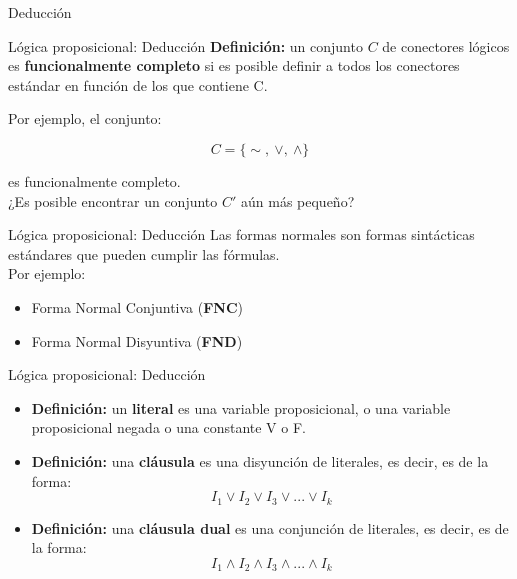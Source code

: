 \documentclass{beamer}
\begin{document}
\begin{frame}[plain,c]
  \vspace{1cm}
  \begin{center}
    \Huge Deducción
  \end{center}
\end{frame}


\begin{frame}{Lógica proposicional: Deducción}
  \textbf{Definición:} un conjunto $C$ de conectores lógicos es
  \textbf{funcionalmente completo} si es posible definir a todos los conectores
  estándar en función de los que contiene C.

  Por ejemplo, el conjunto:

  $$ C = \{\sim,\ \vee,\ \land\}$$

  es funcionalmente completo.\\

  ¿Es posible encontrar un conjunto $C'$ aún más pequeño?
\end{frame}


\begin{frame}{Lógica proposicional: Deducción}
  Las formas normales son formas sintácticas estándares que pueden cumplir las
  fórmulas.\\

  Por ejemplo:
  \begin{itemize}
    \item Forma Normal Conjuntiva (\textbf{FNC})
    \item Forma Normal Disyuntiva (\textbf{FND})
  \end{itemize}
\end{frame}


\begin{frame}{Lógica proposicional: Deducción}
  \begin{itemize}[<+->]
    \item \textbf{Definición:} un \textbf{literal} es una variable
          proposicional, o una variable proposicional negada o una constante V o
          F.
    \item \textbf{Definición:} una \textbf{cláusula} es una disyunción de
          literales, es decir, es de la forma:
          $$I_{1} \vee I_{2} \vee I_{3} \vee ... \vee I_{k}$$
    \item \textbf{Definición:} una \textbf{cláusula dual} es una conjunción de
          literales, es decir, es de la forma:
          $$I_{1} \land I_{2} \land I_{3} \land ... \land I_{k}$$
  \end{itemize}
\end{frame}
\end{document}
